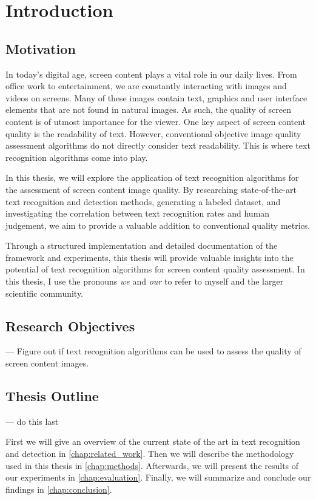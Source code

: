 \chapter{Introduction}
\label{chap:Introduction}

\section{Motivation}

In today’s digital age, screen content plays a vital role in our daily lives.
From office work to entertainment, we are constantly interacting with images and videos on screens.
Many of these images contain text, graphics and user interface elements that are not found in natural images.
As such, the quality of screen content is of utmost importance for the viewer.
One key aspect of screen content quality is the readability of text.
However, conventional objective image quality assessment algorithms do not directly consider text readability.
This is where text recognition algorithms come into play.

In this thesis, we will explore the application of text recognition algorithms for the assessment of screen content image quality.
By researching state-of-the-art text recognition and detection methods, generating a labeled dataset, and investigating the correlation between text recognition rates and human judgement, we aim to provide a valuable addition to conventional quality metrics.

Through a structured implementation and detailed documentation of the framework and experiments, this thesis will provide valuable insights into the potential of text recognition algorithms for screen content quality assessment.
In this thesis, I use the pronouns \textit{we} and \textit{our} to refer to myself and the larger scientific community.

\section{Research Objectives}

--- Figure out if text recognition algorithms can be used to assess the quality of screen content images.

\section{Thesis Outline}

--- do this last

First we will give an overview of the current state of the art in text recognition and detection in \autoref{chap:related_work}.
Then we will describe the methodology used in this thesis in \autoref{chap:methods}.
Afterwards, we will present the results of our experiments in \autoref{chap:evaluation}.
Finally, we will summarize and conclude our findings in \autoref{chap:conclusion}.
